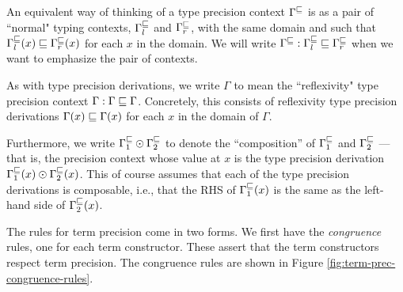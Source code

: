 An equivalent way of thinking of a type precision context $\Gamma^\sqsubseteq$ is as a
pair of ``normal" typing contexts, $\Gamma^\sqsubseteq_l$ and $\Gamma^\sqsubseteq_r$, with the same
domain and such that $\Gamma^\sqsubseteq_l(x) \sqsubseteq \Gamma^\sqsubseteq_r(x)$ for each $x$ in the domain.
We will write $\Gamma^\sqsubseteq : \Gamma^\sqsubseteq_l \sqsubseteq \Gamma^\sqsubseteq_r$ when we want to emphasize the pair of contexts.

As with type precision derivations, we write $\Gamma$ to mean the ``reflexivity" type precision context
$\Gamma : \Gamma \sqsubseteq \Gamma$.
Concretely, this consists of reflexivity type precision derivations $\Gamma(x) \sqsubseteq \Gamma(x)$ for
each $x$ in the domain of $\Gamma$.

Furthermore, we write $\Gamma^\sqsubseteq_1 \odot \Gamma^\sqsubseteq_2$ to denote the ``composition'' of $\Gamma^\sqsubseteq_1$ and $\Gamma^\sqsubseteq_2$
--- that is, the precision context whose value at $x$ is the type precision derivation
$\Gamma^\sqsubseteq_1(x) \odot \Gamma^\sqsubseteq_2(x)$. This of course assumes that each of the type precision
derivations is composable, i.e., that the RHS of $\Gamma^\sqsubseteq_1(x)$ is the same as the left-hand side of $\Gamma^\sqsubseteq_2(x)$.


The rules for term precision come in two forms. We first have the \emph{congruence} rules,
one for each term constructor. These assert that the term constructors respect term precision.
The congruence rules are shown in Figure \ref{fig:term-prec-congruence-rules}.

